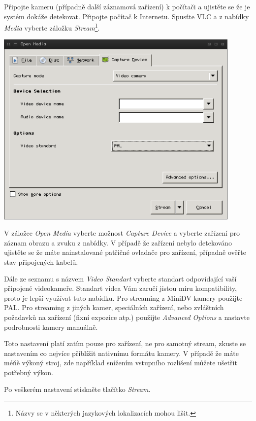 \documentclass[11pt]{article} %
\begin{document}
Připojte kameru (případně další záznamová zařízení) k počítači a ujistěte se že je systém dokáže detekovat. Připojte počítač k Internetu. Spusťte VLC a z nabídky {\em Media} vyberte záložku {\em Stream}\footnote{Názvy se v některých jazykových lokalizacích mohou lišit.}.


\begin{center}
\includegraphics[width=0.9\textwidth]{3}
\end{center}

V záložce {\em Open Media} vyberte možnost {\em Capture Device} a vyberte zařízení pro záznam obrazu a zvuku z nabídky. V případě že zařízení nebylo detekováno ujistěte se že máte nainstalované patřičné ovladače pro zařízení, případně ověřte stav připojených kabelů.

Dále ze seznamu s názvem {\em Video Standart} vyberte standart odpovídající vaší připojené videokameře. Standart videa Vám zaručí jistou míru kompatibility, proto je lepší využívat tuto nabídku. Pro streaming z MiniDV kamery použijte PAL. Pro streaming z jiných kamer, speciálních zařízení, nebo zvláštních požadavků na zařízení (fixní expozice atp.) použijte {\em Advanced Options} a nastavte podrobnosti kamery manuálně.

Toto nastavení platí zatím pouze pro zařízení, ne pro samotný stream, zkuste se nastavením co nejvíce přiblížit nativnímu formátu kamery. V případě že máte méňě výkoný stroj, zde například snížením vstupního rozlišení můžete ušetřit potřebný výkon.

Po veškerém nastavení stiskněte tlačítko {\em Stream}.
\end{document}
